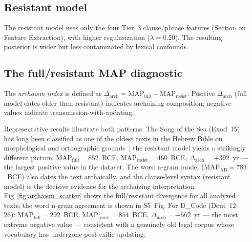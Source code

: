 \documentclass[10pt,letterpaper]{article}
\begin{document}
\subsection*{Resistant model}

The resistant model uses only the four Tier~3 clause/phrase features
(Section on Feature Extraction), with higher regularization
($\lambda = 0.20$).  The resulting posterior is wider but less
contaminated by lexical confounds.

\subsection*{The full/resistant MAP diagnostic}

The \emph{archaism index} is defined as
$\Delta_{\text{arch}} = \text{MAP}_{\text{full}} - \text{MAP}_{\text{resist}}$.
Positive $\Delta_{\text{arch}}$ (full model dates older than resistant)
indicates archaizing composition; negative values indicate
transmission-with-updating.

Representative results illustrate both patterns.  The Song of the Sea
(Exod~15) has long been classified as one of the oldest texts in the
Hebrew Bible on morphological and orthographic grounds~\cite{CrossFreedman1975,Robertson1972};
the resistant model yields a strikingly different picture.
$\text{MAP}_{\text{full}} = 852$~BCE,
$\text{MAP}_{\text{resist}} = 460$~BCE,
$\Delta_{\text{arch}} = +392$~yr --- the largest positive value in the
dataset.  The word n-gram model (MAP$_{\text{AB}} = 783$~BCE) also dates
the text archaically, and the clause-level syntax (resistant model) is
the decisive evidence for the archaizing interpretation.
Fig~\ref{fig:archaism_scatter} shows the full/resistant divergence for
all analyzed texts; the word n-gram agreement is shown in S5~Fig.  For
D\_Code (Deut~12--26): $\text{MAP}_{\text{full}} = 292$~BCE,
$\text{MAP}_{\text{resist}} = 854$~BCE,
$\Delta_{\text{arch}} = -562$~yr --- the most extreme negative value ---
consistent with a genuinely old legal corpus whose vocabulary has
undergone post-exilic updating.
\end{document}
